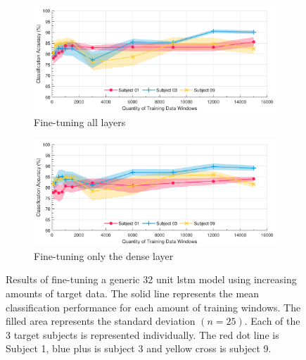 \begin{figure}[p]
    \centering
    \begin{subfigure}{\textwidth}
        \centering
        \includegraphics[width=\textwidth]{content/5-Personalisation/ch5_pre_trained_model_accuracy.pdf}
        \caption{Fine-tuning all layers}
        \label{subfig:ch5_fine-tuning-all-layers}
    \end{subfigure}
    \begin{subfigure}{\textwidth}
        \centering
        \includegraphics[width=\textwidth]{content/5-Personalisation/ch5_frozen_lstm_layer_accuracy.pdf}
        \caption{Fine-tuning only the dense layer}
    \end{subfigure}
    \caption[Results of fine-tuning a generic 32 unit  model using increasing amounts of target data]{Results of fine-tuning a generic 32 unit \acrshort{lstm} model using increasing amounts of target data. The solid line represents the mean classification performance for each amount of training windows. The filled area represents the standard deviation $(n=25)$. Each of the 3 target subjects is represented individually. The red dot line is Subject 1, blue plus is subject 3 and yellow cross is subject 9.}
    \label{fig:ch5_pretrained_model}
\end{figure}
